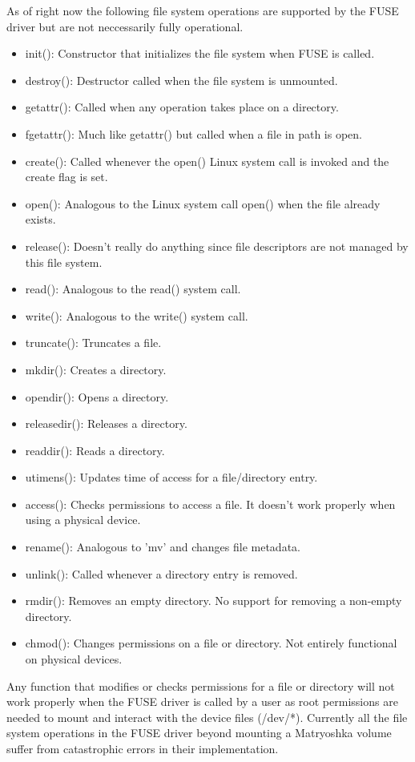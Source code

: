 \documentclass{article}
\begin{document}
\begin{multicols}{2}
As of right now the following file system operations are supported by the FUSE driver but are not neccessarily fully operational.
\begin{itemize}[noitemsep]
\item init(): Constructor that initializes the file system when FUSE is called.
\item destroy(): Destructor called when the file system is unmounted.
\item getattr(): Called when any operation takes place on a directory.
\item fgetattr(): Much like getattr() but called when a file in path is open.
\item create(): Called whenever the open() Linux system call is invoked and the create flag is set.
\item open(): Analogous to the Linux system call open() when the file already exists.
\item release(): Doesn't really do anything since file descriptors are not managed by this file system.
\item read(): Analogous to the read() system call.
\item write(): Analogous to the write() system call.
\item truncate(): Truncates a file.
\item mkdir(): Creates a directory.
\item opendir(): Opens a directory.
\item releasedir(): Releases a directory.
\item readdir(): Reads a directory.
\item utimens(): Updates time of access for a file/directory entry.
\item access(): Checks permissions to access a file. It doesn't work properly when using a physical device.
\item rename(): Analogous to 'mv' and changes file metadata.
\item unlink(): Called whenever a directory entry is removed.
\item rmdir(): Removes an empty directory. No support for removing a non-empty directory.
\item chmod(): Changes permissions on a file or directory. Not entirely functional on physical devices.
\end{itemize}

Any function that modifies or checks permissions for a file or directory will not work properly when the FUSE driver is called by a user as root permissions are needed to mount and interact with the device files (/dev/*).  Currently all the file system operations in the FUSE driver beyond mounting a Matryoshka volume suffer from catastrophic errors in their implementation.


\end{multicols}
\end{document}
